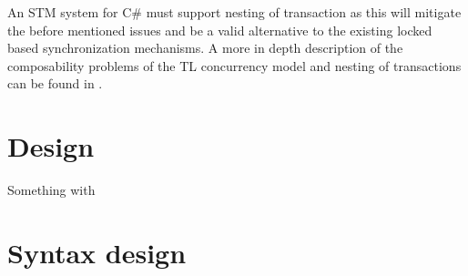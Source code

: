 An \ac{STM} system for C\# must support nesting of transaction as this will mitigate the before mentioned issues and be a valid alternative to the existing locked based synchronization mechanisms. A more in depth description of the composability problems of the \ac{TL} concurrency model and nesting of transactions can be found in \cite{dpt907e14trending}.



\section{Design}
\label{sec:stm_design}
Something with\cite[p. 1]{harris2003language}


\section{Syntax design}

%
%
%
%    
%
%    
         
         

\worksheetend